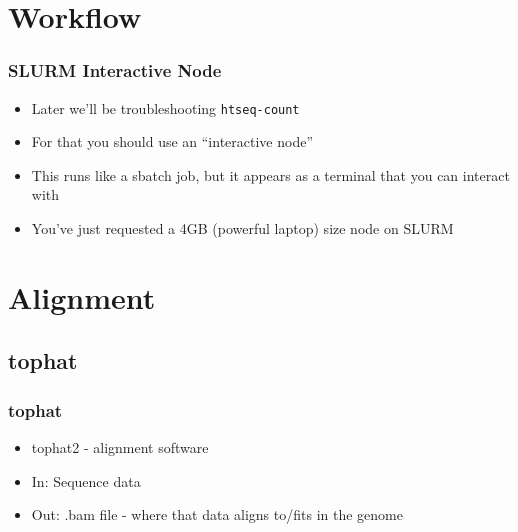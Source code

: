 \documentclass[14pt,handout]{beamer}
\begin{document}
\section{Workflow}

\begin{frame}
\frametitle{SLURM Interactive Node}
\begin{itemize}
	\item Later we'll be troubleshooting \texttt{htseq-count}
	\item For that you should use an ``interactive node''
	\item This runs like a sbatch job, but it appears as a terminal that you can interact with
	\footnotesize
	\ttfamily
	\sffamily
	\item You've just requested a 4GB (powerful laptop) size node on SLURM
\end{itemize}
\end{frame}


\section{Alignment}

\subsection{tophat}

\begin{frame}
\frametitle{tophat}
\begin{itemize}
	\item<+-> tophat2 - alignment software
	\item<+-> In: Sequence data
	\item<+-> Out: .bam file - where that data aligns to/fits in the genome
\end{itemize}
\end{frame}
\end{document}
